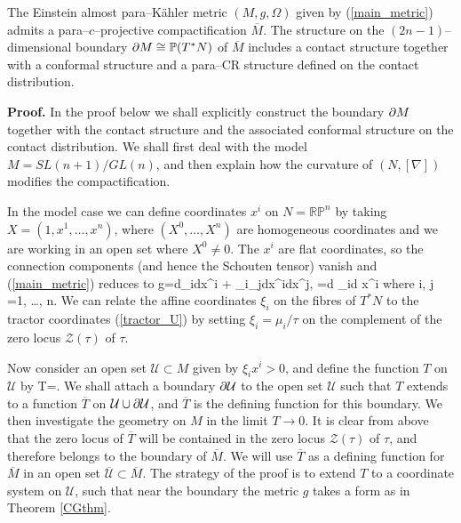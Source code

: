 \begin{theo}
\label{our_thm}
The Einstein almost para--K\"ahler metric $(M, g, \Omega)$ given by 
(\ref{main_metric}) admits a para--$c$--projective compactification
$\overline{M}$. The structure on the
$(2n-1)$--dimensional boundary $\partial M\cong \mathbb{P}(T^* N)$ of $\overline{M}$ includes a contact structure together with a conformal structure 
and a para--CR structure
defined on the contact distribution.
\end{theo}
\noindent
{\bf Proof.}
In the proof below we shall explicitly construct the boundary $\partial M$ together with the contact structure and the associated conformal structure on the contact distribution. We shall
first deal with the model $M=SL(n+1)/GL(n)$, and then explain how the curvature
of $(N, [\nabla])$ modifies the compactification.

In the model case we can define coordinates $x^i$ on $N=\mathbb{RP}^n$ by taking $X=(1,x^1,\dots,x^n)$, where $(X^0,\dots,X^n)$ are homogeneous coordinates and we are working in an open set where $X^0\neq 0$. The ${x^i}$ are flat coordinates, so the connection components (and hence the Schouten tensor) vanish and (\ref{main_metric}) reduces to
\be
\label{model_metric}
g=d\xi_i\odot dx^i + \xi_i\xi_jdx^i\odot dx^j, \qquad
\Omega=d \xi_i\wedge d x^i \quad
\mbox{where}\quad
i, j =1, \dots, n.
\ee
We can relate \cite{DM} the affine coordinates $\xi_i$ on the fibres of $T^*N$ to the tractor coordinates (\ref{tractor_U}) by setting $\xi_i=\mu_i/\tau$ on the complement of the zero locus ${\mathcal Z}(\tau)$ of $\tau$.

Now consider an open set  ${\mathcal U}\subset M$ given
by  $\xi_ix^i>0$, and define the function $T$ on ${\mathcal U}$ by
\be
\label{formula_for_T}
T=.
\ee
We shall attach a boundary  $\partial \mathcal{U}$ to the open set $\mathcal{U}$ 
such that $T$ extends to a function $\overline{T}$ on $\mathcal{U}\cup \partial \mathcal{U}$, and
$\overline{T}$ is  the defining function for this boundary.
We then investigate the geometry on $M$ in the limit $T\rightarrow 0$.
It is clear from above that
the zero locus of $\overline{T}$ will be contained in the zero locus $\mathcal{Z}(\tau)$ of $\tau$, and
therefore belongs to the boundary of $\overline{M}$. We will 
use $\overline{T}$ as a defining function for $\overline{M}$ in an open set $\overline{\mathcal{U}}\subset\overline{M}$.
The strategy of the proof is to extend $T$ to a coordinate system on 
$\mathcal{U}$, such that near the boundary the metric $g$ takes a form
as in Theorem \ref{CGthm}.


